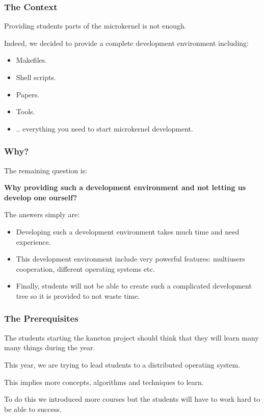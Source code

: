 
\begin{frame}
  \frametitle{The Context}

  Providing students parts of the microkernel is not enough.

  \nl

  Indeed, we decided to provide a complete development environment
  including:

  \begin{itemize}
    \item
      Makefiles.
    \item
      Shell scripts.
    \item
      Papers.
    \item
      Tools.
    \item
      .. everything you need to start microkernel development.
  \end{itemize}
\end{frame}


\begin{frame}
  \frametitle{Why?}

  The remaining question is:

  \nl

  \textbf{Why providing such a development environment and not letting us
    develop one ourself?}

  \nl

  The answers simply are:

  \begin{itemize}
    \item
      Developing such a development environment takes much time and
      need experience.
    \item
      This development environment include very powerful features:
      multiusers cooperation, different operating systems etc.
    \item
      Finally, students will not be able to create such a complicated
      development tree so it is provided to not waste time.
  \end{itemize}
\end{frame}


\begin{frame}
  \frametitle{The Prerequisites}

  The students starting the kaneton project should think that they
  will learn many many things during the year.

  \nl

  This year, we are trying to lead students to a distributed operating
  system.

  \nl

  This implies more concepts, algorithms and techniques to learn.

  \nl

  To do this we introduced more courses but the students will have
  to work hard to be able to success.
\end{frame}

